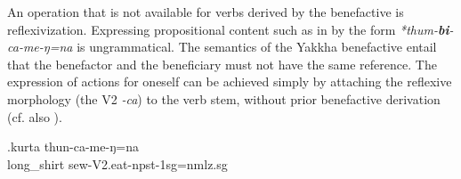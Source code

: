  
An operation that is not available for verbs derived by the benefactive is reflexivization. Expressing propositional content such as in  \Next by the form \emph{*thum-\textbf{bi}-ca-me-ŋ=na} is ungrammatical. The semantics of the Yakkha benefactive entail that the benefactor and the beneficiary must not have the same reference. The expression of actions for oneself can be achieved simply by attaching the reflexive morphology (the V2 \emph{-ca}) to the verb stem, without prior benefactive derivation (cf. also ).

\exg.kurta thun-ca-me-ŋ=na \\
	long\_shirt sew{\sc -V2.eat-npst-1sg=nmlz.sg} 	\\



